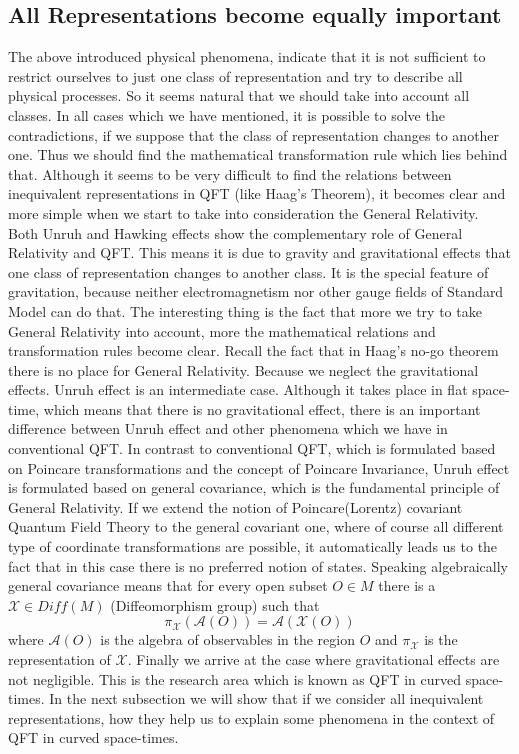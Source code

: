 \documentclass[12pt,a4paper]{article}
\begin{document}
\subsection{All Representations become equally important}
The above introduced physical phenomena, indicate that it is not sufficient to restrict ourselves to just one class of representation and try to describe all physical processes. So it seems natural that we should take into account all classes. In all cases which we have mentioned, it is possible to solve the contradictions, if we suppose that the class of representation changes to another one. Thus we should find the mathematical transformation rule which lies behind that. Although it seems to be very difficult to find the relations between inequivalent representations in QFT (like Haag's Theorem), it becomes clear and more simple when we start  to take into consideration the General Relativity. Both Unruh and Hawking effects show the complementary role of General Relativity and QFT. This means it is due to gravity and gravitational effects that one class of representation changes to another class. It is the special feature of gravitation, because neither electromagnetism nor other gauge fields of Standard Model can do that. The interesting thing is the fact that more we try to take General Relativity into account, more the mathematical relations and transformation rules  become clear. Recall the fact that in Haag's no-go theorem there is no place for General Relativity. Because we neglect the gravitational effects. Unruh effect is an intermediate case. Although it takes place in flat space-time, which means that there is no gravitational effect, there is an important difference between Unruh effect and other phenomena which we have in conventional QFT. In contrast to conventional QFT, which is formulated based on Poincare transformations and the concept of Poincare Invariance, Unruh effect is formulated based on general covariance, which is the fundamental principle of General Relativity. If we extend the notion of Poincare(Lorentz) covariant Quantum Field Theory to the general covariant one, where of course all different type of coordinate transformations are possible, it automatically leads us to the fact that in this case there is no preferred notion of states. Speaking algebraically general covariance means that for every open subset $O \in M$ there is a $\mathcal{X}  \in Diff(M)$ (Diffeomorphism group) such that  \cite{Salehi}
\begin{equation}
\pi_{\mathcal{X}}(\mathcal{A}(O))=\mathcal{A}(\mathcal{X}(O))
\end{equation}
where $\mathcal{A}(O)$ is the algebra of observables in the region $O$ and $\pi_{\mathcal{X}}$ is the representation of $\mathcal{X}$. 
Finally we arrive at the case where gravitational effects are not negligible. This is the research area which is known as QFT in curved space-times. In the next subsection we will show that if we consider all inequivalent representations, how they help us to explain some phenomena in the context of QFT in curved space-times.
\end{document}

